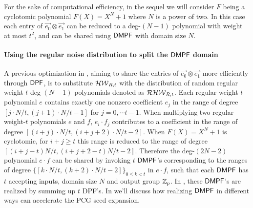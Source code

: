 For the sake of computational efficiency, in the sequel we will consider $F$ being a cyclotomic polynomial $F(X) = X^N+1$ where $N$ is a power of two. In this case each entry of $\vec{e_0}\otimes \vec{e_1}$ can be reduced to a deg-$(N-1)$ polynomial with weight at most $t^2$, and can be shared using ${\sf DMPF}$ with domain size $N$. 

 \paragraph{Using the regular noise distribution to split the ${\sf DMPF}$ domain}
A previous optimization in \cite{cryptoeprint:2022/1035}, aiming to share the entries of $\vec{e_0}\otimes \vec{e_1}$ more efficiently through ${\sf DPF}$, is to substitute $\mathcal{HW}_{R,t}$ with the distribution of random regular weight-$t$ deg-$(N-1)$ polynomials denoted as $\mathcal{RHW}_{R,t}$. Each regular weight-$t$ polynomial $e$ contains exactly one nonzero coefficient $e_j$ in the range of degree $[j\cdot N/t, (j+1)\cdot N/t-1]$ for $j=0,\cdots t-1$. When multiplying two regular weight-$t$ polynomials $e$ and $f$, $e_i\cdot f_j$ contributes to a coefficient in the range of degree $[(i+j)\cdot N/t, (i+j+2)\cdot N/t-2]$. When $F(X) = X^N+1$ is cyclotomic, for $i+j\ge t$ this range is reduced to the range of degree $[(i+j-t)N/t, (i+j+2-t)N/t-2]$. Therefore the deg-$(2N-2)$ polynomial $e\cdot f$ can be shared by invoking $t$ ${\sf DMPF}$'s corresponding to the ranges of degree $\{[k\cdot N/t, (k+2)\cdot N/t-2]\}_{0\le k<t}$ in $e\cdot f$, such that each ${\sf DMPF}$ has $t$ accepting inputs, domain size $N$ and output group $\mathbb{Z}_p$. In \cite{cryptoeprint:2022/1035}, these ${\sf DMPF}$'s are realized by summing up $t$ DPF's. In  we'll discuss how realizing ${\sf DMPF}$ in different ways can accelerate the PCG seed expansion. 


